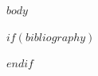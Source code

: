 \documentclass[10pt,a4paper]{article}
\begin{document}
$body$

$if(bibliography)$


$endif$
\end{document}
